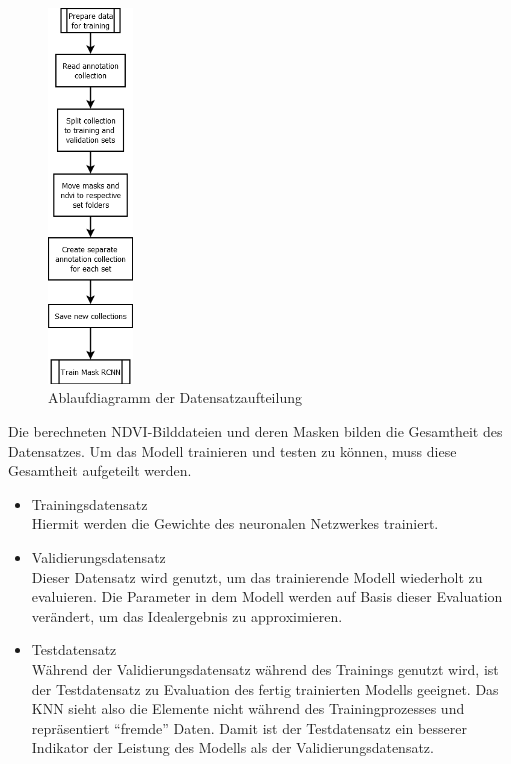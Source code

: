 \begin{figure}[ht]
  \centering
  \includegraphics[height=0.5\textheight,width=0.2\textwidth]{pics/create-sets.png}
  \caption{Ablaufdiagramm der Datensatzaufteilung}
  \label{fig:create-datasets}
\end{figure}
\noindent
Die berechneten NDVI-Bilddateien und deren Masken bilden die Gesamtheit des Datensatzes. Um das Modell trainieren und testen zu können, muss diese Gesamtheit aufgeteilt werden. 
\begin{itemize}
	\item Trainingsdatensatz \\
		Hiermit werden die Gewichte des neuronalen Netzwerkes trainiert.
	\item Validierungsdatensatz \\ 
		Dieser Datensatz wird genutzt, um das trainierende Modell wiederholt zu evaluieren. Die Parameter in dem Modell werden auf Basis dieser Evaluation verändert, um das Idealergebnis zu approximieren.
	\item Testdatensatz \\
		Während der Validierungsdatensatz während des Trainings genutzt wird, ist der Testdatensatz zu Evaluation des fertig trainierten Modells geeignet. Das KNN sieht also die Elemente nicht während des Trainingprozesses und repräsentiert "`fremde"' Daten. Damit ist der Testdatensatz ein besserer Indikator der Leistung des Modells als der Validierungsdatensatz.
\end{itemize}

